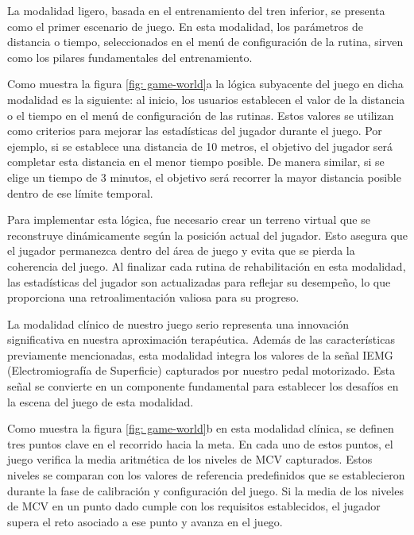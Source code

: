 La modalidad ligero, basada en el entrenamiento del tren inferior, se presenta como el primer escenario de juego. En esta 
modalidad, los parámetros de distancia o tiempo, seleccionados en el menú de configuración de la rutina, sirven como los pilares 
fundamentales del entrenamiento.

\vspace{5pt}
Como muestra la figura \ref{fig: game-world}a la lógica subyacente del juego en dicha modalidad es la siguiente: al inicio, los usuarios establecen el valor de la distancia o el tiempo en el menú de configuración de las rutinas. Estos valores se utilizan como criterios para mejorar las estadísticas del jugador durante el juego. Por ejemplo, si se establece una distancia de 10 metros, el objetivo del jugador será completar esta distancia en el menor tiempo posible. De manera similar, si se elige un tiempo de 3 minutos, el objetivo será recorrer la mayor distancia posible dentro de ese límite temporal.

\vspace{5pt}
Para implementar esta lógica, fue necesario crear un terreno virtual que se reconstruye dinámicamente según la posición actual del jugador. Esto asegura que el jugador permanezca dentro del área de juego y evita que se pierda la coherencia del juego. Al finalizar cada rutina de rehabilitación en esta modalidad, las estadísticas del jugador son actualizadas para reflejar su desempeño, lo que proporciona una retroalimentación valiosa para su progreso.

La modalidad clínico de nuestro juego serio representa una innovación significativa en nuestra aproximación terapéutica. Además de las características previamente mencionadas, esta modalidad integra los valores de la señal IEMG (Electromiografía de Superficie) capturados por nuestro pedal motorizado. Esta señal se convierte en un componente fundamental para establecer los desafíos en la escena del juego de esta modalidad.

\vspace{5pt}
Como muestra la figura \ref{fig: game-world}b en esta modalidad clínica, se definen tres puntos clave en el recorrido hacia la meta. En cada uno de estos puntos, el juego verifica la media aritmética de los niveles de MCV capturados. Estos niveles se comparan con los valores de referencia predefinidos que se establecieron durante la fase de calibración y configuración del juego. Si la media de los niveles de MCV en un punto dado cumple con los requisitos establecidos, el jugador supera el reto asociado a ese punto y avanza en el juego.

